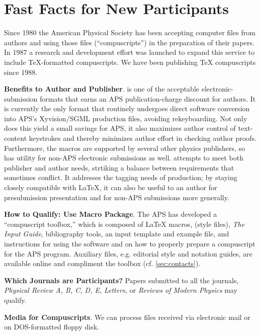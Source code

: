 \nobreak
\section{Fast Facts for New Participants}
\label{sec:fastfacts}

Since 1980 the American Physical Society has been accepting computer files
from authors and using those files (``compuscripts'') in the preparation of
their papers. In 1987 a research and development effort was launched to
expand this service to include \TeX-formatted compuscripts. We have been
publishing \TeX{} compuscripts since 1988.

\medskip
{\bf Benefits to Author and Publisher}. \REVTeX{} is one of the
acceptable electronic-submission formats that earns an APS
publication-charge discount for authors. It is currently the only
format that routinely undergoes direct software conversion into APS's
Xyvision/SGML production files, avoiding rekeyboarding. Not only does
this yield a small savings for APS, it also maximizes author control
of text-content keystrokes and thereby minimizes author effort in
checking author proofs. Furthermore, the macros are supported by
several other physics publishers, so \REVTeX{} has utility for non-APS
electronic submissions as well. \REVTeX{} attempts to meet both
publisher and author needs, strtiking a balance between requirements
that sometimes conflict. It addresses the tagging needs of production;
by staying closely compatible with \LaTeX, it can also be useful to an
author for presubmission presentation and for non-APS submissions more
generally. 


\medskip
{\bf How to Qualify: Use \REVTeX{} Macro Package}. The APS has
developed a ``compuscript toolbox,'' which is composed of \LaTeX{} 
macros, (style files), {\it The \REVTeX{} Input Guide}, bibliography
tools, an input template and example file, and instructions for using
the software and on how to properly prepare a compuscript for the APS
program. Auxiliary files, e.g. editorial style and notation guides,
are available online and compliment the toolbox (cf.
\ref{sec:contacts}). 

\medskip

{\bf Which Journals are Participants?} Papers submitted to all the
journals, {\em Physical
Review A, B, C, D, E,} {\em Letters,\/} or {\em Reviews of Modern
Physics} may qualify.

\medskip
{\bf Media for Compuscripts}. We can process files received via electronic
mail or on DOS-formatted floppy disk.

